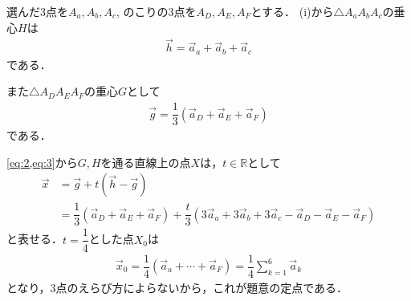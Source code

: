 \documentclass[../../main.tex]{subfiles}
\begin{document}
選んだ3点を$A_a, A_b, A_c$, のこりの3点を$A_D, A_E, A_F$とする．
(i)から$\triangle A_aA_bA_c$の垂心$H$は
\begin{align}
  \vec{h} = \vec{a}_a + \vec{a}_b + \vec{a}_c \label{eq:2}
\end{align}
である．

また$\triangle A_DA_EA_F$の重心$G$として
\begin{align}
  \vec{g} = \dfrac{1}{3} (\vec{a}_D + \vec{a}_E + \vec{a}_F) \label{eq:3}
\end{align}
である．

\cref{eq:2,eq:3}から$G, H$を通る直線上の点$X$は，$t \in \mathbb{R}$として
\begin{align}
  \vec{x}
  & = \vec{g} + t(\vec{h}-\vec{g}) \\
  & = \dfrac{1}{3} (\vec{a}_D + \vec{a}_E + \vec{a}_F) + \dfrac{t}{3} (3\vec{a}_a + 3\vec{a}_b + 3\vec{a}_c - \vec{a}_D - \vec{a}_E - \vec{a}_F)
\end{align}
と表せる．$t = \dfrac{1}{4}$とした点$X_0$は
\begin{align}
  \vec{x}_0 = \dfrac{1}{4} (\vec{a}_a + \cdots + \vec{a}_F) = \dfrac{1}{4} \sum_{k=1}^6 \vec{a}_k
\end{align}
となり，3点のえらび方によらないから，これが題意の定点である．
\end{document}
